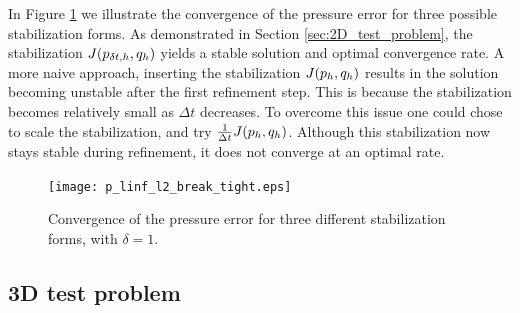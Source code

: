In Figure \ref{fig:alternative_stabilization} we illustrate the convergence of the pressure error for three possible stabilization forms. As demonstrated in Section \ref{sec:2D_test_problem}, the stabilization $J({{p}_{\delta t,h}},{q}_{h})$ yields a stable solution and optimal convergence rate. A more naive approach, inserting the stabilization $J(p_h,{q}_{h})$ results in the solution becoming unstable after the first refinement step. This is because the stabilization becomes relatively small as $\Delta t$ decreases. To overcome this issue one could chose to scale the stabilization, and try  $\frac{1}{\Delta t} J(p_h,{q}_{h})$. Although this stabilization now stays stable during refinement, it does not converge at an optimal rate. 

\begin{figure}[H]
\begin{center}
\texttt{[image: p\_linf\_l2\_break\_tight.eps]}
\end{center}
\caption{Convergence of the pressure error for three different stabilization forms, with $\delta=1$. \label{fig:alternative_stabilization}}
\end{figure}


\subsection{3D test problem}
\label{sec:3D_test_problem}

